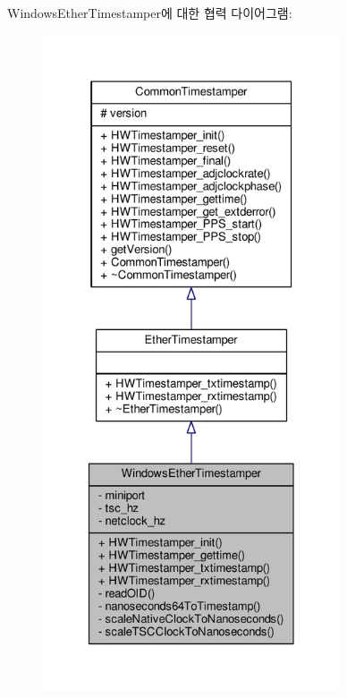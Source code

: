 Windows\+Ether\+Timestamper에 대한 협력 다이어그램\+:
\nopagebreak
\begin{figure}[H]
\begin{center}
\leavevmode
\includegraphics[height=550pt]{class_windows_ether_timestamper__coll__graph}
\end{center}
\end{figure}
